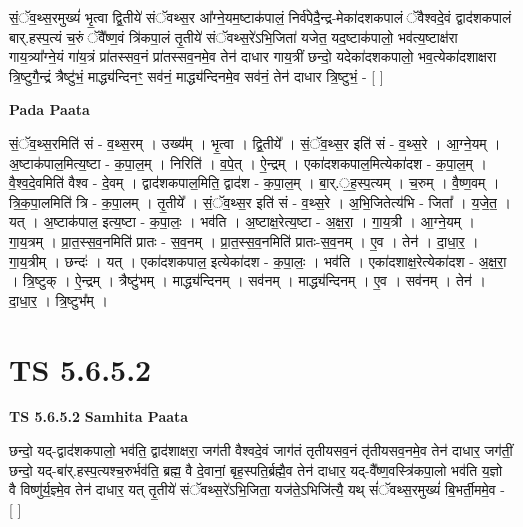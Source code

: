 \documentclass[17pt]{extarticle}
\begin{document}
सं॒ॅव॒थ्स॒रमुख्यं॑ भृ॒त्वा द्वि॒तीये॑ संॅवथ्स॒र आ᳚ग्ने॒यम॒ष्टाक॑पालं॒ निर्व॑पेदै॒न्द्र-मेका॑दशकपालं ॅवैश्वदे॒वं द्वाद॑शकपालं बार्.हस्प॒त्यं च॒रुं ॅवै᳚ष्ण॒वं त्रि॑कपा॒लं तृ॒तीये॑ संॅवथ्स॒रे॑ऽभि॒जिता॑ यजेत॒ यद॒ष्टाक॑पालो॒ भव॑त्य॒ष्टाक्ष॑रा गाय॒त्र्या᳚ग्ने॒यं गा॑य॒त्रं प्रा॑तस्सव॒नं प्रा॑तस्सव॒नमे॒व तेन॑ दाधार गाय॒त्रीं छन्दो॒ यदेका॑दशकपालो॒ भव॒त्येका॑दशाक्षरा त्रि॒ष्टुगै॒न्द्रं त्रैष्टु॑भं॒ माद्ध्य॑न्दिनꣳ॒॒ सव॑नं॒ माद्ध्य॑न्दिनमे॒व सव॑नं॒ तेन॑ दाधार त्रि॒ष्टुभं॒ - [  ] \newline

\textbf{Pada Paata} \newline

सं॒ॅव॒थ्स॒रमिति॑ सं - व॒थ्स॒रम् । उख्य᳚म् । भृ॒त्वा । द्वि॒तीये᳚ । सं॒ॅव॒थ्स॒र इति॑ सं - व॒थ्स॒रे । आ॒ग्ने॒यम् । अ॒ष्टाक॑पाल॒मित्य॒ष्टा - क॒पा॒ल॒म् । निरिति॑ । व॒पे॒त् । ऐ॒न्द्रम् । एका॑दशकपाल॒मित्येका॑दश - क॒पा॒ल॒म् । वै॒श्व॒दे॒वमिति॑ वैश्व - दे॒वम् । द्वाद॑शकपाल॒मिति॒ द्वाद॑श - क॒पा॒ल॒म् । बा॒र्.॒ह॒स्प॒त्यम् । च॒रुम् । वै॒ष्ण॒वम् । त्रि॒क॒पा॒लमिति॑ त्रि - क॒पा॒लम् । तृ॒तीये᳚ । सं॒ॅव॒थ्स॒र इति॑ सं - व॒थ्स॒रे । अ॒भि॒जितेत्य॑भि - जिता᳚ । य॒जे॒त॒ । यत् । अ॒ष्टाक॑पाल॒ इत्य॒ष्टा - क॒पा॒लः॒ । भव॑ति । अ॒ष्टाक्ष॒रेत्य॒ष्टा - अ॒क्ष॒रा॒ । गा॒य॒त्री । आ॒ग्ने॒यम् । गा॒य॒त्रम् । प्रा॒त॒स्स॒व॒नमिति॑ प्रातः - स॒व॒नम् । प्रा॒त॒स्स॒व॒नमिति॑ प्रातः-स॒व॒नम् । ए॒व । तेन॑ । दा॒धा॒र॒ । गा॒य॒त्रीम् । छन्दः॑ । यत् । एका॑दशकपाल॒ इत्येका॑दश - क॒पा॒लः॒ । भव॑ति । एका॑दशाक्ष॒रेत्येका॑दश - अ॒क्ष॒रा॒ । त्रि॒ष्टुक् । ऐ॒न्द्रम् । त्रैष्टु॑भम् । माद्ध्य॑न्दिनम् । सव॑नम् । माद्ध्य॑न्दिनम् । ए॒व । सव॑नम् । तेन॑ । दा॒धा॒र॒ । त्रि॒ष्टुभ᳚म् ।  \newline




\section*{ TS 5.6.5.2 }

\textbf{TS 5.6.5.2 } \newline
\textbf{Samhita Paata} \newline

छन्दो॒ यद्-द्वाद॑शकपालो॒ भव॑ति॒ द्वाद॑शाक्षरा॒ जग॑ती वैश्वदे॒वं जाग॑तं तृतीयसव॒नं तृ॑तीयसव॒नमे॒व तेन॑ दाधार॒ जग॑तीं॒ छन्दो॒ यद्-बा॑र्.हस्प॒त्यश्च॒रुर्भव॑ति॒ ब्रह्म॒ वै दे॒वानां॒ बृह॒स्पति॒र्ब्रह्मै॒व तेन॑ दाधार॒ यद्-वै᳚ष्ण॒वस्त्रि॑कपा॒लो भव॑ति य॒ज्ञो वै विष्णु॑र्य॒ज्ञ्मे॒व तेन॑ दाधार॒ यत् तृ॒तीये॑ संॅवथ्स॒रे॑ऽभि॒जिता॒ यज॑ते॒ऽभिजि॑त्यै॒ यथ् सं॑ॅवथ्स॒रमुख्यं॑ बि॒भर्ती॒ममे॒व - [  ] \newline
\end{document}
